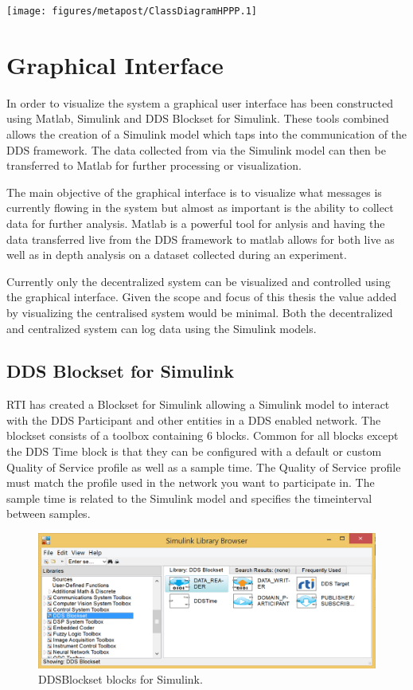 \texttt{[image: figures/metapost/ClassDiagramHPPP.1]}

\section{Graphical Interface} \label{sec:graphicalInterface}
In order to visualize the system a graphical user interface has been constructed using Matlab, Simulink and DDS Blockset for Simulink.
These tools combined allows the creation of a Simulink model which taps into the communication of the DDS framework.
The data collected from via the Simulink model can then be transferred to Matlab for further processing or visualization.

The main objective of the graphical interface is to visualize what messages is currently flowing in the system but almost as important is the ability to collect data for further analysis.
Matlab is a powerful tool for anlysis and having the data transferred live from the DDS framework to matlab allows for both live as well as in depth analysis on a dataset collected during an experiment.

Currently only the decentralized system can be visualized and controlled using the graphical interface. Given the scope and focus of this thesis the value added by visualizing the centralised system would be minimal. Both the decentralized and centralized system can log data using the Simulink models.

\subsection{DDS Blockset for Simulink}
RTI has created a Blockset for Simulink allowing a Simulink model to interact with the DDS Participant and other entities in a DDS enabled network.
The blockset consists of a toolbox containing 6 blocks. Common for all blocks except the DDS Time block is that they can be configured with a default or custom Quality of Service profile as well as a sample time. The Quality of Service profile must match the profile used in the network you want to participate in. The sample time is related to the Simulink model and specifies the timeinterval between samples.

\begin{figure}[h]
\includegraphics[width=\textwidth]{figures/DDSBlockset}
	\caption[DDSBlockset blocks for Simulink]{
		\label{fig:DDSBlocksetBlocks} 
		\footnotesize{%
			DDSBlockset blocks for Simulink.
		}
	}
\end{figure}


